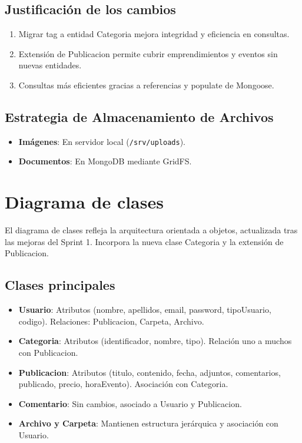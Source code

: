 \subsection*{Justificación de los cambios}
\begin{enumerate}
  \item Migrar {tag} a entidad {Categoria} mejora integridad y eficiencia en consultas.
  \item Extensión de {Publicacion} permite cubrir emprendimientos y eventos sin nuevas entidades.
  \item Consultas más eficientes gracias a referencias y {populate} de Mongoose.
\end{enumerate}

\subsection*{Estrategia de Almacenamiento de Archivos}
\begin{itemize}
  \item \textbf{Imágenes}: En servidor local (\texttt{/srv/uploads}).
  \item \textbf{Documentos}: En MongoDB mediante GridFS.
\end{itemize}



\section{Diagrama de clases}

El diagrama de clases refleja la arquitectura orientada a objetos, actualizada tras las mejoras del Sprint 1. Incorpora la nueva clase {Categoria} y la extensión de {Publicacion}.

\subsection*{Clases principales}
\begin{itemize}
  \item \textbf{Usuario}: Atributos ({nombre}, {apellidos}, {email}, {password}, {tipoUsuario}, {codigo}). Relaciones: {Publicacion}, {Carpeta}, {Archivo}.
  \item \textbf{Categoria}: Atributos ({identificador}, {nombre}, {tipo}). Relación uno a muchos con {Publicacion}.
  \item \textbf{Publicacion}: Atributos ({titulo}, {contenido}, {fecha}, {adjuntos}, {comentarios}, {publicado}, {precio}, {horaEvento}). Asociación con {Categoria}.
  \item \textbf {Comentario}: Sin cambios, asociado a {Usuario} y {Publicacion}.
  \item \textbf {Archivo y Carpeta}: Mantienen estructura jerárquica y asociación con {Usuario}.
\end{itemize}

